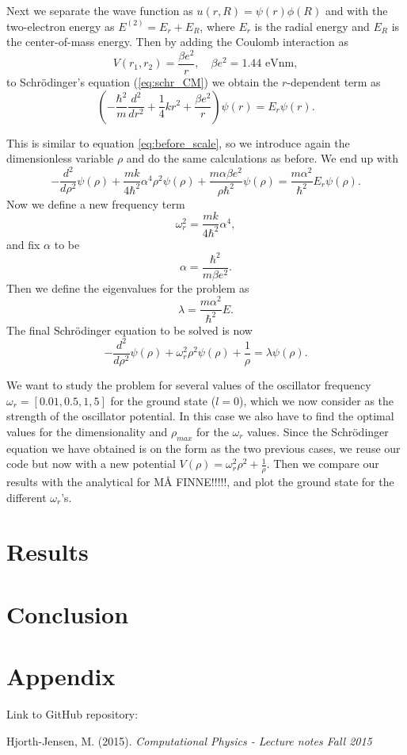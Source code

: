 \documentclass[12pt,a4paper,english]{article}
\begin{document}
Next we separate the wave function as $u(r,R)=\psi(r)\phi(R)$ and with the two-electron energy as $E^{(2)}=E_r+E_R$, where $E_r$ is the radial energy and $E_R$ is the center-of-mass energy. Then by adding the Coulomb interaction as 
\[V(r_1,r_2)=\frac{\beta e^2}{r},\quad \beta e^2=1.44 \text{ eVnm},\]
to Schrödinger's equation (\ref{eq:schr_CM}) we obtain the $r$-dependent term as
\begin{equation}
\label{eq:shcr_split_2}
\left(-\frac{\hbar^2}{m}\frac{d^2}{dr^2}+\frac{1}{4}kr^2+\frac{\beta e^2}{r}\right)\psi(r)=E_r\psi(r).
\end{equation}

This is similar to equation \ref{eq:before_scale}, so we introduce again the dimensionless variable $\rho$ and do the same calculations as before. We end up with 
\begin{equation}
\label{eq:before_alpha_2}
-\frac{d^2}{d\rho^2}\psi(\rho)+\frac{mk}{4\hbar^2}\alpha^4\rho^2\psi(\rho)+\frac{m\alpha\beta e^2}{\rho\hbar^2}\psi(\rho)=\frac{m\alpha^2}{\hbar^2}E_r\psi(\rho).
\end{equation}
Now we define a new frequency term
\[\omega_r^2=\frac{mk}{4\hbar^2}\alpha^4,\]
and fix $\alpha$ to be
\[\alpha=\frac{\hbar^2}{m\beta e^2}.\]
Then we define the eigenvalues for the problem as 
\begin{equation}
\label{eq:eigenval_2}
\lambda=\frac{m\alpha^2}{\hbar^2}E.
\end{equation}
The final Schrödinger equation to be solved is now
\begin{equation}
\label{eq:final_schr_2}
-\frac{d^2}{d\rho^2}\psi(\rho)+\omega_r^2\rho^2\psi(\rho)+\frac{1}{\rho}=\lambda\psi(\rho).
\end{equation}

We want to study the problem for several values of the oscillator frequency $\omega_r=[0.01, 0.5, 1, 5]$ for the ground state ($l=0$), which we now consider as the strength of the oscillator potential. In this case we also have to find the optimal values for the dimensionality and $\rho_{max}$ for the $\omega_r$ values. Since the Schrödinger equation we have obtained is on the form as the two previous cases, we reuse our code but now with a new potential $V(\rho)=\omega_r^2\rho^2+\frac{1}{\rho}$. Then we compare our results with the analytical for MÅ FINNE!!!!!, and plot the ground state for the different $\omega_r$'s.

\section{Results}
\section{Conclusion}

\appendix
\section{Appendix}
\label{sect:appendix}
Link to GitHub repository:

\begin{thebibliography}{}
Hjorth-Jensen, M. (2015). \textit{Computational Physics - Lecture notes Fall 2015}
\end{thebibliography}
\end{document}
